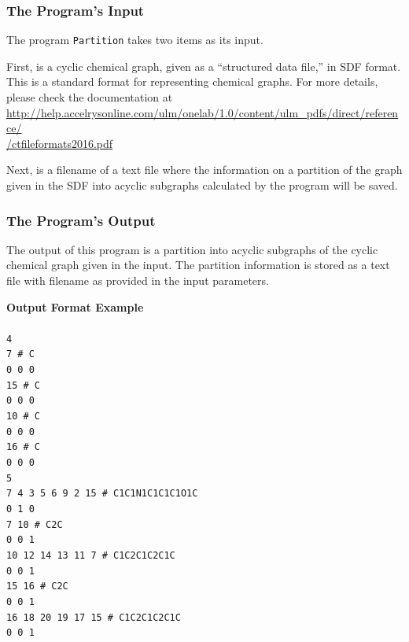 \documentclass[11pt,titlepage,dvipdfmx,twoside]{book}
\begin{document}
\subsubsection{The Program's Input}
\label{sec:Input_p}


The program {\tt Partition} takes two items as its input.

First, is a cyclic chemical graph, given as a ``structured data file,'' in  SDF format.
This is a standard format for representing chemical graphs.
For more details, please check the documentation at \\
\url{ http://help.accelrysonline.com/ulm/onelab/1.0/content/ulm_pdfs/direct/reference/} \\
\url{/ctfileformats2016.pdf} 

Next,  is a filename of a text file where the information on 
a partition of the graph given in the SDF into acyclic subgraphs
calculated by the program will be saved.


\subsubsection{The Program's Output}
\label{sec:Output_p}

The output of this program is a 
partition into acyclic subgraphs of the cyclic chemical graph given in
the input.
The partition information is stored as a text file with filename as provided
in the input parameters.


\begin{oframed}
{\bf Output Format Example}\\\\
{\tt 4 \\
7 \# C \\
0 0 0 \\
15 \# C \\
0 0 0 \\
10 \# C \\
0 0 0 \\
16 \# C \\
0 0 0 \\
5 \\
7 4 3 5 6 9 2 15 \# C1C1N1C1C1C1O1C \\
0 1 0 \\
7 10 \# C2C \\
0 0 1 \\
10 12 14 13 11 7 \# C1C2C1C2C1C \\
0 0 1 \\
15 16 \# C2C \\
0 0 1 \\
16 18 20 19 17 15 \# C1C2C1C2C1C \\
0 0 1 \\}
\end{oframed}
\end{document}
